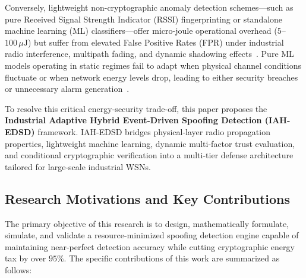 \documentclass[journal]{IEEEtran}
\begin{document}
Conversely, lightweight non-cryptographic anomaly detection schemes---such as pure Received Signal Strength Indicator (RSSI) fingerprinting or standalone machine learning (ML) classifiers---offer micro-joule operational overhead ($5$--$100\,\mu\text{J}$) but suffer from elevated False Positive Rates (FPR) under industrial radio interference, multipath fading, and dynamic shadowing effects~\cite{ref_rssi_fading_16, ref_ml_ids_17}. Pure ML models operating in static regimes fail to adapt when physical channel conditions fluctuate or when network energy levels drop, leading to either security breaches or unnecessary alarm generation~\cite{ref_adaptive_trust_18}.

To resolve this critical energy-security trade-off, this paper proposes the \textbf{Industrial Adaptive Hybrid Event-Driven Spoofing Detection (IAH-EDSD)} framework. IAH-EDSD bridges physical-layer radio propagation properties, lightweight machine learning, dynamic multi-factor trust evaluation, and conditional cryptographic verification into a multi-tier defense architecture tailored for large-scale industrial WSNs.

\subsection{Research Motivations and Key Contributions}
The primary objective of this research is to design, mathematically formulate, simulate, and validate a resource-minimized spoofing detection engine capable of maintaining near-perfect detection accuracy while cutting cryptographic energy tax by over $95\%$. The specific contributions of this work are summarized as follows:
\end{document}
